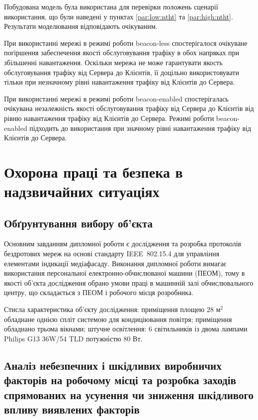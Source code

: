 \documentclass[a4paper,ukrainian,utf8,nocolumnsxix,floatsection,equationsection]{eskdtext}
\newcommand{\iee}[0]{IEEE~802.15.4\xspace}
\newcommand{\blm}[0]{beacon-less\xspace}
\newcommand{\bem}[0]{beacon-enabled\xspace}
\begin{document}
Побудована модель була використана для перевірки положень сценарії використання, що були наведені у пунктах \ref{par:low:ntht} та \ref{par:high:ntht}. Результати моделювання відповідають очікуваним.

При використанні мережі в режимі роботи \blm спостерігалося очікуване погіршення забеспечення якості обслуговування трафіку в обох напряках при збільшенні навантаження. Оскільки мережа не може гарантувати якость обслуговування трафіку від Сервера до Клієнтів, її доцільно використовувати тільки при незначному рівні навантаження трафіку від Клієнтів до Сервера.

При використанні мережі в режимі роботи \bem спостерігалась очікувана незалежність якості обслуговування трафіку від Сервера до Клієнтів від  рівню навантаження трафіку від Клієнтів до Сервера. Режимі роботи \bem підходить до використання при значному рівні навантаження трафіку від Клієнтів до Сервера.

\section{Охорона праці та безпека в надзвичайних ситуаціях}
\label{sec:work_safety}

\subsection{Обґрунтування вибору об’єкта}

Основним завданням дипломної роботи є дослідження та розробка протоколів бездротових мереж на основі стандарту \iee для управління елементами індикації медіафасаду. Виконання дипломної роботи вимагає використання персональної електронно-обчислюваної машини (ПЕОМ), тому в якості об’єкта дослідження обрано умови праці в машинній залі обчислювального центру, що складається з ПЕОМ і робочого місця розробника.

Стисла характеристика об’єкту дослідження: приміщення площею $28 \text{ м}^2$ обладнане однією спліт системою для кондиціювання повітря; приміщення обладнано трьома вікнами; штучне освітлення: 6 світильників із двома лампами Philips G13 36W/54 TLD потужністю 80 Вт.


\subsection{Аналіз небезпечних і шкідливих виробничих факторів на робочому місці та розробка заходів спрямованих на усунення чи зниження шкідливого впливу виявлених факторів}
\end{document}
